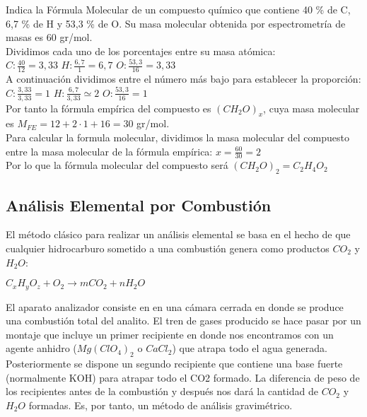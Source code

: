 \begin{exercise}
	Indica la Fórmula Molecular de un compuesto químico que contiene 40 \% de C, 6,7 \% de H y 53,3 \% de O. Su masa molecular obtenida por espectrometría de masas es 60 gr/mol.\\
	
	Dividimos cada uno de los porcentajes entre su masa atómica:\\
	
	$C: \frac{40}{12}=3,33$
	$H: \frac{6,7}{1}=6,7$ 
	$O: \frac{53,3}{16}=3,33$\\
	
	A continuación dividimos entre el número más bajo para establecer la proporción:\\
	
	$C: \frac{3,33}{3,33}=1$
	$H: \frac{6,7}{3,33} \simeq 2$ 
	$O: \frac{53,3}{16}=1$\\
	
	Por tanto la fórmula empírica del compuesto es $(CH_2O)_x$, cuya masa molecular es $M_{FE} = 12 + 2 \cdot 1 + 16 = 30$ gr/mol.\\
	
	Para calcular la formula molecular, dividimos la masa molecular del compuesto entre la masa molecular de la fórmula empírica:
	$x = \frac{60}{30}=2$\\
	
	Por lo que la fórmula molecular del compuesto será $(CH_2O)_2 = C_2H_4O_2$
	
\end{exercise}

\subsection{Análisis Elemental por Combustión}

El método clásico para realizar un análisis elemental se basa en el hecho de que cualquier hidrocarburo sometido a una combustión genera como productos $CO_2$ y $H_2O$:\\

\begin{center}
	$C_xH_yO_z + O_2 \rightarrow mCO_2 + nH_2O$
\end{center}

El aparato analizador consiste en en una cámara cerrada en donde se produce una combustión total del analito. El tren de gases producido se hace pasar por un montaje que incluye un primer recipiente en donde nos encontramos con un agente anhidro ($Mg(ClO_4)_2$ o $CaCl_2$) que atrapa todo el agua generada. Posteriormente se dispone un segundo recipiente que contiene una base fuerte (normalmente KOH) para atrapar todo el CO2 formado. La diferencia de peso de los recipientes antes de la combustión y después nos dará la cantidad de $CO_2$ y $H_2O$ formadas. Es, por tanto, un método de análisis gravimétrico. 

